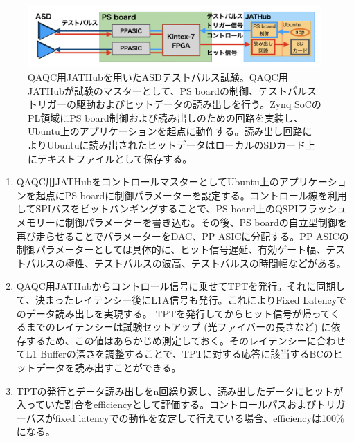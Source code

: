 \begin{figure} 
\centering
\includegraphics[width=16cm]{fig/QAQC/QAQCasdtp.png}
\caption[QAQC用JATHubを用いたASDテストパルス試験]{QAQC用JATHubを用いたASDテストパルス試験。QAQC用JATHubが試験のマスターとして、PS boardの制御、テストパルストリガーの駆動およびヒットデータの読み出しを行う。Zynq SoCのPL領域にPS board制御および読み出しのための回路を実装し、Ubuntu上のアプリケーションを起点に動作する。読み出し回路によりUbuntuに読み出されたヒットデータはローカルのSDカード上にテキストファイルとして保存する。}
\label{QAQCasdtp}
\end{figure}

\begin{enumerate}
    \item QAQC用JATHubをコントロールマスターとしてUbuntu上のアプリケーションを起点にPS boardに制御パラメーターを設定する。コントロール線を利用してSPIバスをビットバンギングすることで、PS board上のQSPIフラッシュメモリーに制御パラメーターを書き込む。その後、PS boardの自立型制御を再び走らせることでパラメーターをDAC、PP ASICに分配する。PP ASICの制御パラメーターとしては具体的に、ヒット信号遅延、有効ゲート幅、テストパルスの極性、テストパルスの波高、テストバルスの時間幅などがある。
    \baselineskip

    \item QAQC用JATHubからコントロール信号に乗せてTPTを発行。それに同期して、決まったレイテンシー後にL1A信号も発行。これによりFixed Latencyでのデータ読み出しを実現する。
    TPTを発行してからヒット信号が帰ってくるまでのレイテンシーは試験セットアップ (光ファイバーの長さなど) に依存するため、この値はあらかじめ測定しておく。そのレイテンシーに合わせてL1 Bufferの深さを調整することで、TPTに対する応答に該当するBCのヒットデータを読み出すことができる。
    \baselineskip

    \item TPTの発行とデータ読み出しをn回繰り返し、読み出したデータにヒットが入っていた割合をefficiencyとして評価する。コントロールパスおよびトリガーパスがfixed latencyでの動作を安定して行えている場合、efficiencyは100\%になる。
    \baselineskip

\end{enumerate}

